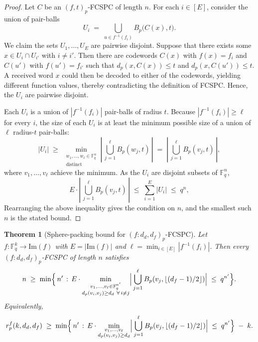 \documentclass[11pt,draftclsnofoot,journal,onecolumn]{IEEEtran}
\newtheorem{theorem}{Theorem}
\begin{document}
    \begin{proof}
    Let $C$ be an $(f,t)_p$-FCSPC of length $n$. For each $i \in [E]$, consider the union of pair-balls
    \[
    U_i \;=\; \bigcup_{u \in f^{-1}(f_i)} B_p\big(C(x), t\big).
    \]
    We claim the sets $U_1, \dots, U_E$ are pairwise disjoint. Suppose that there exists some $x \in U_i \cap U_{i'}$ with $i \ne i'$. Then there are codewords $C(x)$ with $f(x) = f_i$ and $C(u')$ with $f(u') = f_{i'}$ such that $d_p(x, C(x)) \le t$ and $d_p(x, C(u')) \le t$. A received word $x$ could then be decoded to either of the codewords, yielding different function values, thereby contradicting the definition of FCSPC. Hence, the $U_i$ are pairwise disjoint.

    Each $U_i$ is a union of $|f^{-1}(f_i)|$ pair-balls of radius $t$. Because $|f^{-1}(f_i)| \ge \ell$ for every $i$, the size of each $U_i$ is at least the minimum possible size of a union of $\ell$ radius-$t$ pair-balls:
    \[
    |U_i| \;\ge\; \min_{\substack{w_1, \dots, w_\ell \in \mathbb{F}_q^n \\ \text{distinct}}}
    \left|\, \bigcup_{j=1}^{\ell} B_p(w_j, t) \,\right|
    \;=\; \left|\, \bigcup_{j=1}^{\ell} B_p(v_j, t) \,\right|,
    \]
    where $v_1, \dots, v_\ell$ achieve the minimum. As the $U_i$ are disjoint subsets of $\mathbb{F}_q^n$,
    \[
    E \cdot \left|\, \bigcup_{j=1}^{\ell} B_p(v_j, t) \,\right| \;\le\; \sum_{i=1}^{E} |U_i| \;\le\; q^n,
    \]
    Rearranging the above inequality gives the condition on $n$, and the smallest such $n$ is the stated bound.
    \end{proof}


    \begin{theorem}[Sphere-packing bound for $(f:d_d,d_f)_p$-FCSPC]
    \label{thm:sphere-pack-dp}
    Let $f : \mathbb{F}_q^k \to \mathrm{Im}(f)$ with $E = |\mathrm{Im}(f)|$ and $\ell = \min_{i \in [E]} |f^{-1}(f_i)|$. Then every $(f : d_d, d_f)_p$-FCSPC of length $n$ satisfies
    \[
    n \;\ge\; \min\Bigl\{\, n' \,:\,
    E \cdot \min_{\substack{v_1, \dots, v_\ell \in \mathbb{F}_q^{n'}\\
    d_p(v_i, v_j) \ge d_d \ \forall\, i \ne j}}
    \Bigl|\,\bigcup_{j=1}^{\ell} B_p(v_j, \lfloor (d_f - 1)/2 \rfloor)\Bigr|
    \;\le\; q^{n'} \Bigr\}.
    \]
    Equivalently,
    \[
    r_p^f(k, d_d, d_f) \;\ge\; \min\Bigl\{\, n' \,:\,
    E \cdot \min_{\substack{v_1, \dots, v_\ell\\
    d_p(v_i, v_j) \ge d_d}}
    \Bigl|\,\bigcup_{j=1}^{\ell} B_p(v_j, \lfloor (d_f - 1)/2 \rfloor)\Bigr|
    \;\le\; q^{n'} \Bigr\} \;-\; k.
    \]
    \end{theorem}
\end{document}
